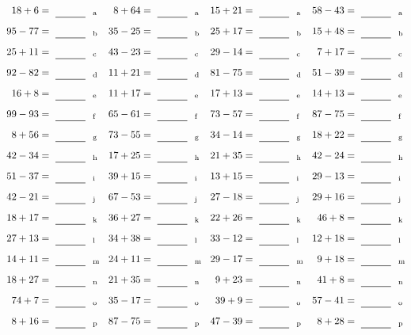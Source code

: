 \documentclass
[
  draft    = true,
  fontsize = 11pt,
  parskip  = half-
]
{scrartcl}
\begin{document}
\clearpage
\begin{align*}
    \pline{18+6}&=\rline{a}
  & \pline{8+64}&=\rline{a}
  & \pline{15+21}&=\rline{a}
  & \pline{58-43}&=\rline{a} \\[1ex]
    \pline{95-77}&=\rline{b}
  & \pline{35-25}&=\rline{b}
  & \pline{25+17}&=\rline{b}
  & \pline{15+48}&=\rline{b} \\[1ex]
    \pline{25+11}&=\rline{c}
  & \pline{43-23}&=\rline{c}
  & \pline{29-14}&=\rline{c}
  & \pline{7+17}&=\rline{c} \\[1ex]
    \pline{92-82}&=\rline{d}
  & \pline{11+21}&=\rline{d}
  & \pline{81-75}&=\rline{d}
  & \pline{51-39}&=\rline{d} \\[1ex]
    \pline{16+8}&=\rline{e}
  & \pline{11+17}&=\rline{e}
  & \pline{17+13}&=\rline{e}
  & \pline{14+13}&=\rline{e} \\[1ex]
    \pline{99-93}&=\rline{f}
  & \pline{65-61}&=\rline{f}
  & \pline{73-57}&=\rline{f}
  & \pline{87-75}&=\rline{f} \\[1ex]
    \pline{8+56}&=\rline{g}
  & \pline{73-55}&=\rline{g}
  & \pline{34-14}&=\rline{g}
  & \pline{18+22}&=\rline{g} \\[1ex]
    \pline{42-34}&=\rline{h}
  & \pline{17+25}&=\rline{h}
  & \pline{21+35}&=\rline{h}
  & \pline{42-24}&=\rline{h} \\[1ex]
    \pline{51-37}&=\rline{i}
  & \pline{39+15}&=\rline{i}
  & \pline{13+15}&=\rline{i}
  & \pline{29-13}&=\rline{i} \\[1ex]
    \pline{42-21}&=\rline{j}
  & \pline{67-53}&=\rline{j}
  & \pline{27-18}&=\rline{j}
  & \pline{29+16}&=\rline{j} \\[1ex]
    \pline{18+17}&=\rline{k}
  & \pline{36+27}&=\rline{k}
  & \pline{22+26}&=\rline{k}
  & \pline{46+8}&=\rline{k} \\[1ex]
    \pline{27+13}&=\rline{l}
  & \pline{34+38}&=\rline{l}
  & \pline{33-12}&=\rline{l}
  & \pline{12+18}&=\rline{l} \\[1ex]
    \pline{14+11}&=\rline{m}
  & \pline{24+11}&=\rline{m}
  & \pline{29-17}&=\rline{m}
  & \pline{9+18}&=\rline{m} \\[1ex]
    \pline{18+27}&=\rline{n}
  & \pline{21+35}&=\rline{n}
  & \pline{9+23}&=\rline{n}
  & \pline{41+8}&=\rline{n} \\[1ex]
    \pline{74+7}&=\rline{o}
  & \pline{35-17}&=\rline{o}
  & \pline{39+9}&=\rline{o}
  & \pline{57-41}&=\rline{o} \\[1ex]
    \pline{8+16}&=\rline{p}
  & \pline{87-75}&=\rline{p}
  & \pline{47-39}&=\rline{p}
  & \pline{8+28}&=\rline{p}
\end{align*}
\end{document}
